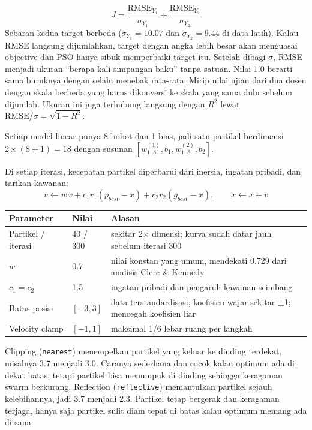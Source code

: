 
\[ J = \frac{\mathrm{RMSE}_{Y_1}}{\sigma_{Y_1}} + \frac{\mathrm{RMSE}_{Y_2}}{\sigma_{Y_2}} \]
Sebaran kedua target berbeda ($\sigma_{Y_1} = 10.07$ dan $\sigma_{Y_2} = 9.44$ di data latih). Kalau RMSE langsung dijumlahkan, target dengan angka lebih besar akan menguasai objective dan PSO hanya sibuk memperbaiki target itu. Setelah dibagi $\sigma$, RMSE menjadi ukuran ``berapa kali simpangan baku'' tanpa satuan. Nilai 1.0 berarti sama buruknya dengan selalu menebak rata-rata. Mirip nilai ujian dari dua dosen dengan skala berbeda yang harus dikonversi ke skala yang sama dulu sebelum dijumlah. Ukuran ini juga terhubung langsung dengan $R^2$ lewat $\mathrm{RMSE}/\sigma = \sqrt{1 - R^2}$.

Setiap model linear punya 8 bobot dan 1 bias, jadi satu partikel berdimensi $2 \times (8 + 1) = 18$ dengan susunan $[w^{(1)}_{1..8}, b_1, w^{(2)}_{1..8}, b_2]$.

Di setiap iterasi, kecepatan partikel diperbarui dari inersia, ingatan pribadi, dan tarikan kawanan:
\[ v \leftarrow w\,v + c_1 r_1 (p_{best} - x) + c_2 r_2 (g_{best} - x), \qquad x \leftarrow x + v \]

\begin{tabularx}{\textwidth}{@{}llL@{}}
\toprule
\textbf{Parameter} & \textbf{Nilai} & \textbf{Alasan} \\
\midrule
Partikel / iterasi & 40 / 300 & sekitar 2$\times$ dimensi; kurva sudah datar jauh sebelum iterasi 300 \\
$w$ & 0.7 & nilai konstan yang umum, mendekati 0.729 dari analisis Clerc \& Kennedy \\
$c_1 = c_2$ & 1.5 & ingatan pribadi dan pengaruh kawanan seimbang \\
Batas posisi & $[-3, 3]$ & data terstandardisasi, koefisien wajar sekitar $\pm$1; mencegah koefisien liar \\
Velocity clamp & $[-1, 1]$ & maksimal 1/6 lebar ruang per langkah \\
\bottomrule
\end{tabularx}

Clipping (\texttt{nearest}) menempelkan partikel yang keluar ke dinding terdekat, misalnya 3.7 menjadi 3.0. Caranya sederhana dan cocok kalau optimum ada di dekat batas, tetapi partikel bisa menumpuk di dinding sehingga keragaman swarm berkurang. Reflection (\texttt{reflective}) memantulkan partikel sejauh kelebihannya, jadi 3.7 menjadi 2.3. Partikel tetap bergerak dan keragaman terjaga, hanya saja partikel sulit diam tepat di batas kalau optimum memang ada di sana.

